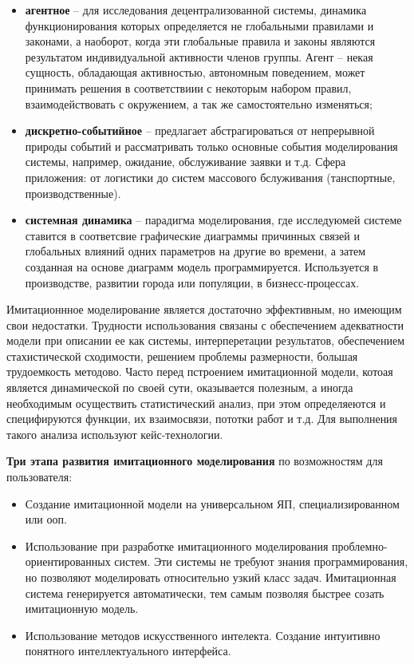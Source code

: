 \begin{itemize}
    \item \textbf{агентное} -- для исследования децентрализованной системы, динамика функционирования которых определяется не глобальными правилами и законами, а наоборот, когда эти глобальные правила и законы являются результатом индивидуальной активности членов группы. Агент -- некая сущность, обладающая активностью, автономным поведением, может принимать решения в соответствиии с некоторым набором правил, взаимодействовать с окружением, а так же самостоятельно изменяться;
    \item \textbf{дискретно-событийное} -- предлагает абстрагироваться от непрерывной природы событий и рассматривать только основные события моделирования системы, например, ожидание, обслуживание заявки и т.д. Сфера приложения: от логистики до систем массового бслуживания (танспортные, производственные).
    \item \textbf{системная динамика} -- парадигма моделирования, где исследуюмей системе ставится в соответсвие графические диаграммы причинных связей и глобальных влияний одних параметров на другие во времени, а затем созданная на основе диаграмм модель программируется. Используется в производстве, развитии города или популяции, в бизнесс-процессах.
\end{itemize}

Имитационнное моделирование является достаточно эффективным, но имеющим свои недостатки. Трудности использования связаны с обеспечением адекватности модели при описании ее как системы, интерперетации результатов, обеспечением стахистической сходимости, решением проблемы размерности, большая трудоемкость методово. Часто перед пстроением имитационной модели, котоая является динамической по своей сути, оказывается полезным, а иногда необходимым осуществить статистический анализ, при этом определяеются и специфируются функции, их взаимосвязи, пототки работ и т.д. Для выполнения такого анализа используют кейс-технологии.

\textbf{Три этапа развития имитационного моделирования} по возможностям для пользователя:

\begin{itemize}
    \item Создание имитационной модели на универсальном ЯП, специализированном или ооп.
    \item Использование при разработке имитационного моделирования проблемно-ориентированных систем. Эти системы не требуют знания программирования, но позволяют моделировать относительно узкий класс задач. Имитационная система генерируется автоматически, тем самым позволяя быстрее созать имитационную модель.
    \item Использование методов искусственного интелекта. Создание интуитивно понятного интеллектуального интерфейса.
\end{itemize}

